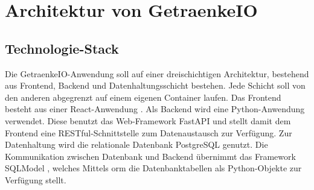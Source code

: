 \documentclass[conference,a4paper]{cs-techrep}
\begin{document}
\section{Architektur von GetraenkeIO} %

\subsection{Technologie-Stack} %
Die GetraenkeIO-Anwendung soll auf einer dreischichtigen Architektur, bestehend aus Frontend, Backend und Datenhaltungsschicht bestehen.
Jede Schicht soll von den anderen abgegrenzt auf einem eigenen Container \cite{conatiners} laufen.
Das Frontend besteht aus einer React-Anwendung \cite{react}.
Als Backend wird eine Python-Anwendung \cite{python} verwendet.
Diese benutzt das Web-Framework FastAPI \cite{fastapi} und stellt damit dem Frontend eine RESTful-Schnittstelle \cite{restful} zum Datenaustausch zur Verfügung.
Zur Datenhaltung wird die relationale Datenbank PostgreSQL \cite{postgresql} genutzt.
Die Kommunikation zwischen Datenbank und Backend übernimmt das Framework SQLModel \cite{sqlmodel}, welches Mittels \ac{orm} die Datenbanktabellen als Python-Objekte zur Verfügung stellt.
\end{document}
